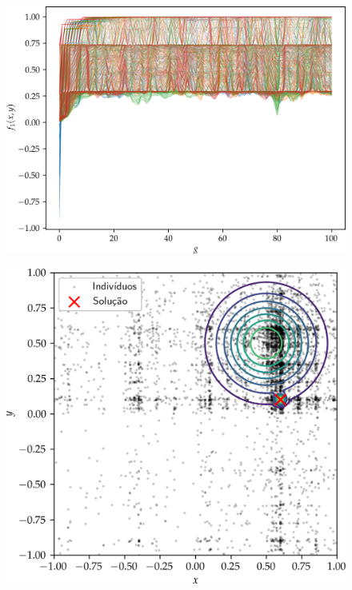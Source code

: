 \begin{frame}
  \begin{figure}
    \centering
    \includegraphics[height=0.95\textheight]{imagens/high_prob/evolution_damped_cossine.png}
  \end{figure}
\end{frame}

\begin{frame}
  \begin{figure}
    \centering
    \includegraphics[height=0.95\textheight]{imagens/high_prob/contour_near_gaussians.png}
  \end{figure}
\end{frame}

